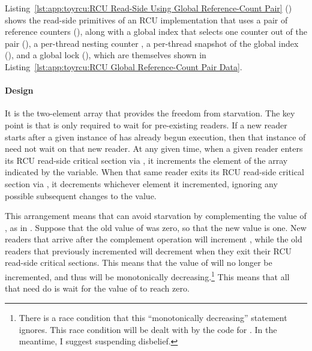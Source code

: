 Listing~\ref{lst:app:toyrcu:RCU Read-Side Using Global Reference-Count Pair}
()
shows the read-side primitives of an RCU implementation that uses a pair
of reference counters (),
along with a global index that
selects one counter out of the pair (),
a per-thread nesting counter ,
a per-thread snapshot of the global index (),
and a global lock (),
which are themselves shown in
Listing~\ref{lst:app:toyrcu:RCU Global Reference-Count Pair Data}.

\paragraph{Design}

It is the two-element  array that provides the freedom
from starvation.
The key point is that  is only required to wait
for pre-existing readers.
If a new reader starts after a given instance of 
has already begun execution, then that instance of 
need not wait on that new reader.
At any given time, when a given reader enters its RCU read-side critical
section via ,
it increments the element of the  array indicated by
the  variable.
When that same reader exits its RCU read-side critical section via
, it decrements whichever element it incremented,
ignoring any possible subsequent changes to the  value.

This arrangement means that  can avoid starvation
by complementing the value of , as in .
Suppose that the old value of  was zero, so that the new
value is one.
New readers that arrive after the complement operation will increment
, while the old readers that previously incremented
 will decrement  when they exit their
RCU read-side critical sections.
This means that the value of  will no longer be incremented,
and thus will be monotonically decreasing.\footnote{
	There is a race condition that this ``monotonically decreasing''
	statement ignores.
	This race condition will be dealt with by the code for
	.
	In the meantime, I suggest suspending disbelief.}
This means that all that  need do is wait for the
value of  to reach zero.


